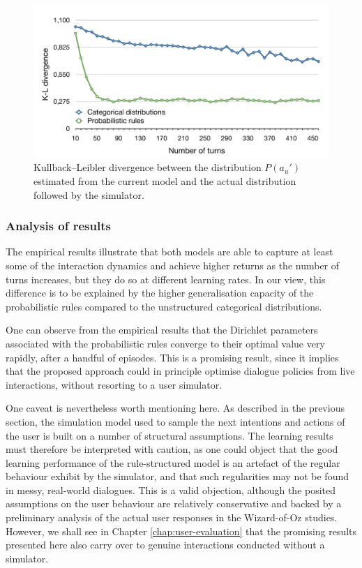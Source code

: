 \begin{figure}[p] 
\begin{center}
\includegraphics[scale=0.42]{imgs/kldivergence.pdf}
\end{center} 
\caption{Kullback--Leibler divergence between the distribution $P(a_u')$ estimated from the current model and the actual distribution followed by the simulator.}
\label{fig:divergence}
\end{figure}

\subsubsection*{Analysis of results}

The empirical results illustrate that both models are able to capture at least some of the interaction dynamics and achieve higher returns as the number of turns increases, but they do so at different learning rates.  In our view, this difference is to be explained by the higher generalisation capacity of the probabilistic rules compared to the unstructured categorical distributions.  

One can observe from the empirical results that the Dirichlet parameters associated with the probabilistic rules converge to their optimal value very rapidly, after a handful of episodes.  This is a promising result, since it implies that the proposed approach could in principle optimise dialogue policies from live interactions, without resorting to a user simulator.

One caveat is nevertheless worth mentioning here.  As described in the previous section, the simulation model used to sample the next intentions and actions of the user is built on a number of structural assumptions.  The learning results must therefore be interpreted with caution, as one could object that the good learning performance of the rule-structured model is an artefact of the regular behaviour exhibit by the simulator, and that such regularities may not be found in messy, real-world dialogues. This is a valid objection, although the posited assumptions on the user behaviour are relatively conservative and backed by a preliminary analysis of the actual user responses in the Wizard-of-Oz studies. However, we shall see in Chapter \ref{chap:user-evaluation} that the promising results presented here also carry over to genuine interactions conducted without a simulator. 

